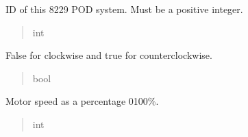 \documentclass[letterpaper,10pt,english]{sphinxmanual}
\begin{document}
\begin{fulllineitems}
\begin{fulllineitems}
\begin{quote}
\begin{description}
\end{description}\end{quote}

\end{fulllineitems}


\begin{fulllineitems}
\label{\detokenize{Setup_PodParameters:Setup_PodParameters.Params_8229.systemID}}
\pysigstartsignatures
{}
\pysigstopsignatures
\sphinxAtStartPar
ID of this 8229 POD system. Must be a positive integer.
\begin{quote}\begin{description}
\sphinxAtStartPar
int

\end{description}\end{quote}

\end{fulllineitems}


\begin{fulllineitems}
\label{\detokenize{Setup_PodParameters:Setup_PodParameters.Params_8229.motorDirection}}
\pysigstartsignatures
{}
\pysigstopsignatures
\sphinxAtStartPar
False for clockwise and true for counterclockwise.
\begin{quote}\begin{description}
\sphinxAtStartPar
bool

\end{description}\end{quote}

\end{fulllineitems}


\begin{fulllineitems}
\label{\detokenize{Setup_PodParameters:Setup_PodParameters.Params_8229.motorSpeed}}
\pysigstartsignatures
{}
\pysigstopsignatures
\sphinxAtStartPar
Motor speed as a percentage 0\sphinxhyphen{}100\%.
\begin{quote}\begin{description}
\sphinxAtStartPar
int


\end{description}
\end{quote}
\end{fulllineitems}
\end{fulllineitems}
\end{document}
